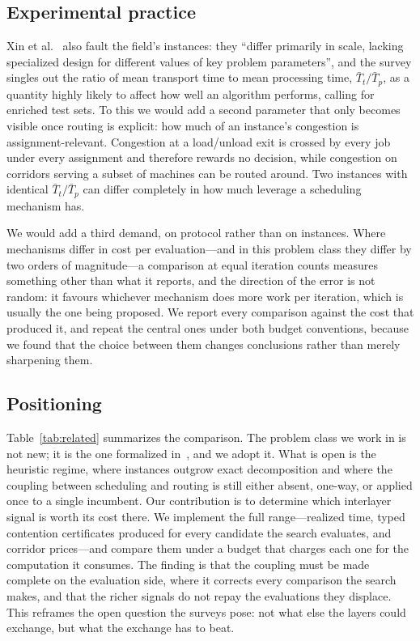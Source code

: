 \documentclass[manuscript,screen,review]{acmart}
\begin{document}
\subsection{Experimental practice}

Xin et al.~\cite{xin2025review} also fault the field's instances: they ``differ
primarily in scale, lacking specialized design for different values of key
problem parameters'', and the survey singles out the ratio of mean transport time
to mean processing time, $\bar{T}_t/\bar{T}_p$, as a quantity highly likely to
affect how well an algorithm performs, calling for enriched test sets. To this we
would add a second parameter that only becomes visible once routing is explicit:
how much of an instance's congestion is assignment-relevant. Congestion at a
load/unload exit is crossed by every job under every assignment and therefore
rewards no decision, while congestion on corridors serving a subset of machines
can be routed around. Two instances with identical $\bar{T}_t/\bar{T}_p$ can
differ completely in how much leverage a scheduling mechanism has.

We would add a third demand, on protocol rather than on instances. Where
mechanisms differ in cost per evaluation---and in this problem class they differ by
two orders of magnitude---a comparison at equal iteration counts measures
something other than what it reports, and the direction of the error is not
random: it favours whichever mechanism does more work per iteration, which is
usually the one being proposed. We report every comparison against the cost that
produced it, and repeat the central ones under both budget conventions, because we
found that the choice between them changes conclusions rather than merely
sharpening them.

\subsection{Positioning}

Table~\ref{tab:related} summarizes the comparison. The problem class we work in
is not new; it is the one formalized in~\cite{vanos2026exact}, and we adopt it.
What is open is the heuristic regime, where instances outgrow exact
decomposition and where the coupling between scheduling and routing is still
either absent, one-way, or applied once to a single incumbent. Our contribution
is to determine which interlayer signal is worth its cost there. We implement the
full range---realized time, typed contention certificates produced for every
candidate the search evaluates, and corridor prices---and compare them under a
budget that charges each one for the computation it consumes. The finding is that
the coupling must be made complete on the evaluation side, where it corrects
every comparison the search makes, and that the richer signals do not repay the
evaluations they displace. This reframes the open question the surveys pose:
not what else the layers could exchange, but what the exchange has to beat.
\end{document}
